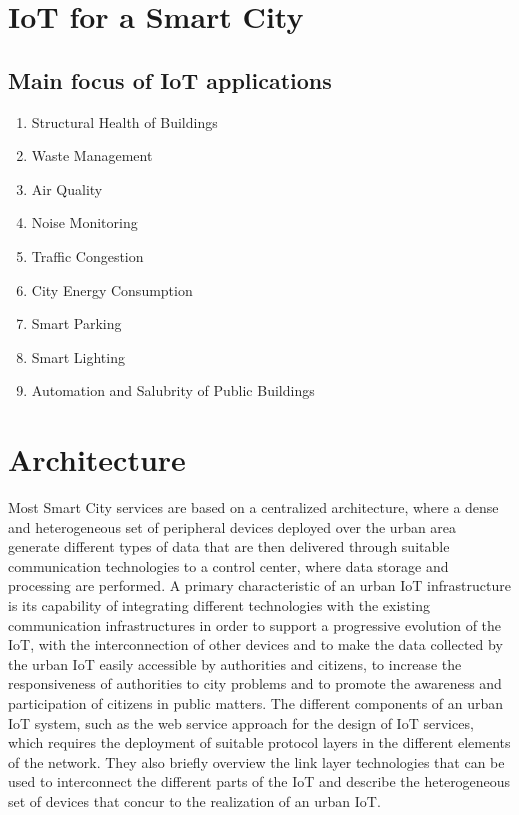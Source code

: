 \documentclass{article}
\begin{document}
\section{IoT for a Smart City}

\subsection{Main focus of IoT applications}

\begin{enumerate}
\item Structural Health of Buildings
\item Waste Management
\item Air Quality
\item Noise Monitoring
\item Traffic Congestion
\item City Energy Consumption
\item Smart Parking
\item Smart Lighting
\item Automation and Salubrity of Public Buildings
\end{enumerate}

\section{Architecture}

Most Smart City services are based on a centralized architecture, where a dense and heterogeneous set of peripheral devices deployed over the urban area generate different types of data that are then delivered through suitable communication technologies to a control center, where data storage and processing are performed.
A primary characteristic of an urban IoT infrastructure is its capability of integrating different technologies with the existing communication infrastructures in order to support a progressive evolution of the IoT, with the interconnection of other devices and to make the data collected by the urban IoT easily accessible by authorities and citizens, to increase the responsiveness of authorities to city problems and to promote the awareness and participation of citizens in public matters.
The different components of an urban IoT system, such as the web service approach for the design of IoT services, which requires the deployment of suitable protocol layers in the different elements of the network. They also briefly overview the link layer technologies that can be used to interconnect the different parts of the IoT and describe the heterogeneous set of devices that concur to the realization of an urban IoT.
\end{document}
